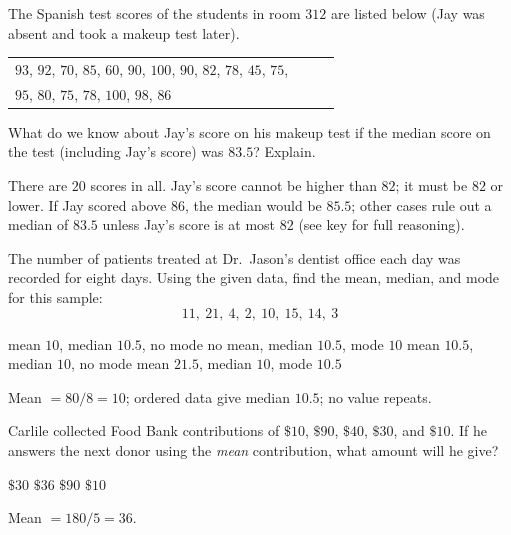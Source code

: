 \question[10]
The Spanish test scores of the students in room $312$ are listed below (Jay was absent and took a makeup test later).
\begin{center}
  \small 
  \begin{tabular}{p{0.88\linewidth}}
    $93$, $92$, $70$, $85$, $60$, $90$, $100$, $90$, $82$, $78$, $45$, $75$, \\
    $95$, $80$, $75$, $78$, $100$, $98$, $86$
  \end{tabular}
\end{center}
What do we know about Jay's score on his makeup test if the median score on the test (including Jay's score) was $83.5$? Explain.
\begin{solutionorbox}[1.2in]
  There are $20$ scores in all. Jay's score cannot be higher than $82$; it must be $82$ or lower. If Jay scored above $86$, the median would be $85.5$; other cases rule out a median of $83.5$ unless Jay's score is at most $82$ (see key for full reasoning).
\end{solutionorbox}


\newpage


\question[5]
The number of patients treated at Dr.\ Jason's dentist office each day was recorded for eight days. Using the given data, find the mean, median, and mode for this sample:
\[
  11,\ 21,\ 4,\ 2,\ 10,\ 15,\ 14,\ 3
\]
\begin{choices}
  \CorrectChoice mean $10$, median $10.5$, no mode
  \choice no mean, median $10.5$, mode $10$
  \choice mean $10.5$, median $10$, no mode
  \choice mean $21.5$, median $10$, mode $10.5$
\end{choices}
\begin{solution}
  Mean $= 80/8 = 10$; ordered data give median $10.5$; no value repeats.
\end{solution}

\question[5]
Carlile collected Food Bank contributions of $\$10$, $\$90$, $\$40$, $\$30$, and $\$10$. If he answers the next donor using the \emph{mean} contribution, what amount will he give?
\begin{choices}
  \choice $\$30$
  \CorrectChoice $\$36$
  \choice $\$90$
  \choice $\$10$
\end{choices}
\begin{solution}
  Mean $= 180/5 = 36$.
\end{solution}

